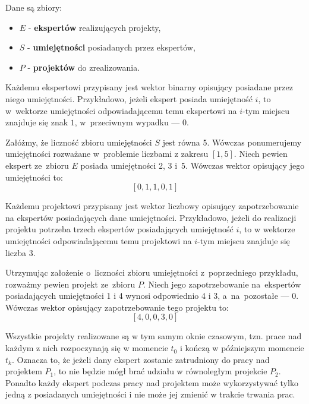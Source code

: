 \documentclass[12pt,a4paper]{article}
\theoremstyle{definition}
\begin{document}
\noindent
Dane są zbiory:
\begin{itemize}
	\item $E$ - \textbf{ekspertów} realizujących projekty,
	\item $S$ - \textbf{umiejętności} posiadanych przez ekspertów,
	\item $P$ - \textbf{projektów} do zrealizowania.\\
\end{itemize}

\noindent
Każdemu ekspertowi przypisany jest wektor binarny opisujący posiadane przez niego umiejętności. Przykładowo, jeżeli ekspert posiada umiejętność $i$, to w~wektorze umiejętności odpowiadającemu temu ekspertowi na $i$-tym miejscu znajduje się znak $1$, w~przeciwnym wypadku --- $0$.\\

\begin{tcolorbox}[title=Przykład --- wektory ekspertów]
Załóżmy, że liczność zbioru umiejętności $S$ jest równa 5. Wówczas ponumerujemy umiejętności rozważane w~problemie liczbami z zakresu $[1, 5]$. Niech pewien ekspert ze~zbioru $E$ posiada umiejętności 2, 3 i~5. Wówczas wektor opisujący jego umiejętności to:
$$[0, 1, 1, 0, 1]$$
\end{tcolorbox}

\vspace{0.5em}
\noindent
Każdemu projektowi przypisany jest wektor liczbowy opisujący zapotrzebowanie na ekspertów posiadających dane umiejętności. Przykładowo, jeżeli do realizacji projektu potrzeba trzech ekspertów posiadających umiejętność $i$, to w wektorze umiejętności odpowiadającemu temu projektowi na $i$-tym miejscu znajduje się liczba $3$.\\

\begin{tcolorbox}[title=Przykład --- wektory zapotrzebowania projektów]
Utrzymując założenie o~liczności zbioru umiejętności z~poprzedniego przykładu, rozważmy pewien projekt ze~zbioru $P$. Niech jego zapotrzebowanie na~ekspertów posiadających umiejętności 1 i 4 wynosi odpowiednio 4 i 3, a~na~pozostałe --- 0. Wówczas wektor opisujący zapotrzebowanie tego projektu to:
$$[4, 0, 0, 3, 0]$$
\end{tcolorbox}

\vspace{0.5em}
\noindent
Wszystkie projekty realizowane są w tym samym oknie czasowym, tzn. prace nad każdym z nich rozpoczynają się w momencie $t_0$ i kończą w późniejszym momencie $t_k$. Oznacza to, że jeżeli dany ekspert zostanie zatrudniony do pracy nad projektem $P_1$, to nie będzie mógł brać udziału w równoległym projekcie $P_2$. Ponadto każdy ekspert podczas pracy nad projektem może wykorzystywać tylko jedną z posiadanych umiejętności i nie może jej zmienić w trakcie trwania prac.\\
\end{document}
